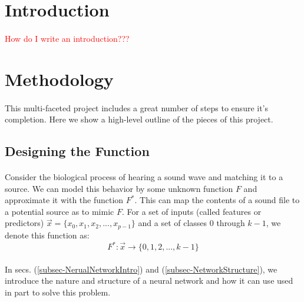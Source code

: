 \documentclass[12pt,letterpaper]{article}
\begin{document}
\section{Introduction}
\label{sec-Introduction}

\paragraph*{}\textcolor{red}{How do I write an introduction???}


\newpage
\section{Methodology}
\label{sec-Methodology}

\paragraph*{}This multi-faceted project includes a great number of steps to ensure it's completion. Here we show a high-level outline of the pieces of this project. 


\subsection{Designing the Function}

\paragraph*{}Consider the biological process of hearing a sound wave and matching it to a source. We can model this behavior by some unknown function $F$ and approximate it with the function $F^*$. This can map the contents of a sound file to a potential source as to mimic $F$. For a set of inputs (called features or predictors) $\vec{x} = \big\{ x_0 , x_1 , x_2 , ... , x_{p-1} \big\}$ and a set of classes $0$ through $k-1$, we denote this function as:
\begin{equation}
\label{eqn-MappingFunction}
F^*: \vec{x} \rightarrow \big\{ 0 , 1 , 2 , ... , k-1 \big\}
\end{equation}

\paragraph*{}In secs. (\ref{subsec-NerualNetworkIntro}) and (\ref{subsec-NetworkStructure}), we introduce the nature and structure of a neural network and how it can use used in part to solve this problem.
\end{document}
